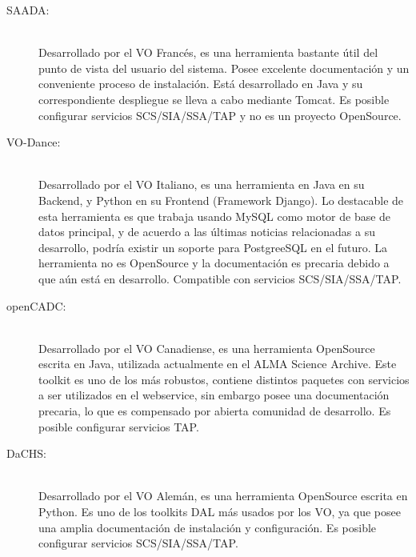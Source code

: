 \begin{description}
    \item[SAADA:] \hfill \\
        Desarrollado por el VO Francés, es una herramienta bastante útil del punto
        de vista del usuario del sistema.
        Posee excelente documentación y un conveniente proceso de instalación.
        Está desarrollado en Java y su correspondiente despliegue se lleva a cabo
        mediante Tomcat.
        Es posible configurar servicios SCS/SIA/SSA/TAP y no es un proyecto
        OpenSource.

    \item[VO-Dance:] \hfill \\
        Desarrollado por el VO Italiano, es una herramienta en Java en su Backend,
        y Python en su Frontend (Framework Django).
        Lo destacable de esta herramienta es que trabaja usando MySQL como motor de
        base de datos principal, y de acuerdo a las últimas noticias relacionadas
        a su desarrollo, podría existir un soporte para PostgreeSQL en el futuro.
        La herramienta no es OpenSource y la documentación es precaria debido
        a que aún está en desarrollo. Compatible con servicios SCS/SIA/SSA/TAP.

    \item[openCADC:] \hfill \\
        Desarrollado por el VO Canadiense, es una herramienta OpenSource escrita en
        Java, utilizada actualmente en el ALMA Science Archive.
        Este toolkit es uno de los más robustos, contiene distintos paquetes con
        servicios a ser utilizados en el webservice, sin embargo posee una
        documentación precaria, lo que es compensado por abierta comunidad de
        desarrollo. Es posible configurar servicios TAP.

    \item[DaCHS:] \hfill \\
        Desarrollado por el VO Alemán, es una herramienta OpenSource escrita en
        Python.
        Es uno de los toolkits DAL más usados por los VO, ya que posee una amplia
        documentación de instalación y configuración.
        Es posible configurar servicios SCS/SIA/SSA/TAP.
\end{description}

